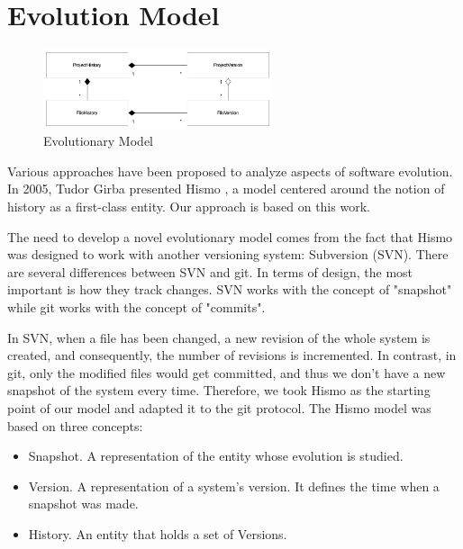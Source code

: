 \section{Evolution Model}
\label{s:EvolutionModel}

\begin{figure}[H]
    \begin{center}
        \includegraphics[width=0.6\textwidth]{EvolutionModel.jpg}
    \end{center}
    \caption{Evolutionary Model}
    \label{fig:EvolutionaryModel}
\end{figure}
Various approaches have been proposed to analyze aspects of software evolution. In 2005, Tudor Girba presented Hismo \cite{Girba2005}, a model centered around the notion of history as a first-class entity. Our approach is based on this work. 

The need to develop a novel evolutionary model comes from the fact that Hismo was designed to work with another versioning system: Subversion (SVN). 
There are several differences between SVN and git. In terms of design, the most important is how they track changes. 
SVN works with the concept of "snapshot" while git works with the concept of "commits".

In SVN, when a file has been changed, a new revision of the whole system is created, and consequently, the number of revisions is incremented. 
In contrast, in git, only the modified files would get committed, and thus we don't have a new snapshot of the system every time. 
Therefore, we took Hismo as the starting point of our model and adapted it to the git protocol. 
The Hismo model was based on three concepts:
\begin{itemize}
    \item Snapshot. A representation of the entity whose evolution is studied.
    \item Version. A representation of a system's version. It defines the time when a snapshot was made. 
    \item History. An entity that holds a set of Versions.
\end{itemize}

